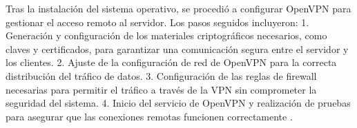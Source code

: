 Tras la instalación del sistema operativo, se procedió a configurar OpenVPN para gestionar el acceso remoto al servidor. Los pasos seguidos incluyeron:
1. Generación y configuración de los materiales criptográficos necesarios, como claves y certificados, para garantizar una comunicación segura entre el servidor y los clientes.
2. Ajuste de la configuración de red de OpenVPN para la correcta distribución del tráfico de datos.
3. Configuración de las reglas de firewall necesarias para permitir el tráfico a través de la VPN sin comprometer la seguridad del sistema.
4. Inicio del servicio de OpenVPN y realización de pruebas para asegurar que las conexiones remotas funcionen correctamente \cite{OpenVPNSetup}.

